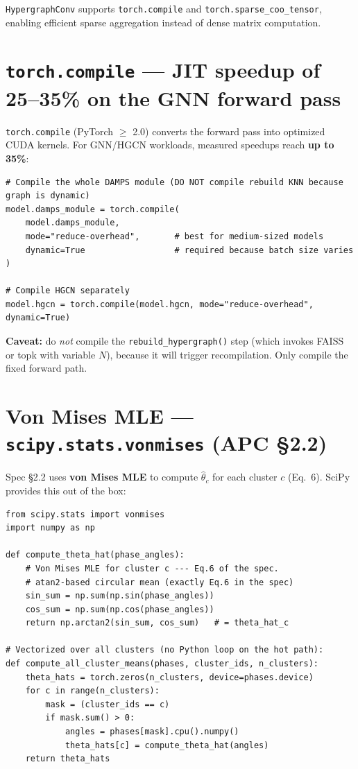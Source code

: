 \documentclass[11pt, a4paper]{article}
\begin{document}
\texttt{HypergraphConv} supports \texttt{torch.compile} and \texttt{torch.sparse\_coo\_tensor}, enabling efficient sparse aggregation instead of dense matrix computation.

\section{\texttt{torch.compile} --- JIT speedup of 25--35\% on the GNN forward pass}

\texttt{torch.compile} (PyTorch $\geq$ 2.0) converts the forward pass into optimized CUDA kernels. For GNN/HGCN workloads, measured speedups reach \textbf{up to 35\%}:

\begin{lstlisting}
# Compile the whole DAMPS module (DO NOT compile rebuild KNN because graph is dynamic)
model.damps_module = torch.compile(
    model.damps_module,
    mode="reduce-overhead",       # best for medium-sized models
    dynamic=True                  # required because batch size varies
)

# Compile HGCN separately
model.hgcn = torch.compile(model.hgcn, mode="reduce-overhead", dynamic=True)
\end{lstlisting}

\textbf{Caveat:} do \emph{not} compile the \texttt{rebuild\_hypergraph()} step (which invokes FAISS or topk with variable $N$), because it will trigger recompilation. Only compile the fixed forward path.

\section{Von Mises MLE --- \texttt{scipy.stats.vonmises} (APC \S2.2)}

Spec \S2.2 uses \textbf{von Mises MLE} to compute $\hat{\theta}_c$ for each cluster $c$ (Eq.~6). SciPy provides this out of the box:

\begin{lstlisting}
from scipy.stats import vonmises
import numpy as np

def compute_theta_hat(phase_angles):
    # Von Mises MLE for cluster c --- Eq.6 of the spec.
    # atan2-based circular mean (exactly Eq.6 in the spec)
    sin_sum = np.sum(np.sin(phase_angles))
    cos_sum = np.sum(np.cos(phase_angles))
    return np.arctan2(sin_sum, cos_sum)   # = theta_hat_c

# Vectorized over all clusters (no Python loop on the hot path):
def compute_all_cluster_means(phases, cluster_ids, n_clusters):
    theta_hats = torch.zeros(n_clusters, device=phases.device)
    for c in range(n_clusters):
        mask = (cluster_ids == c)
        if mask.sum() > 0:
            angles = phases[mask].cpu().numpy()
            theta_hats[c] = compute_theta_hat(angles)
    return theta_hats
\end{lstlisting}
\end{document}
